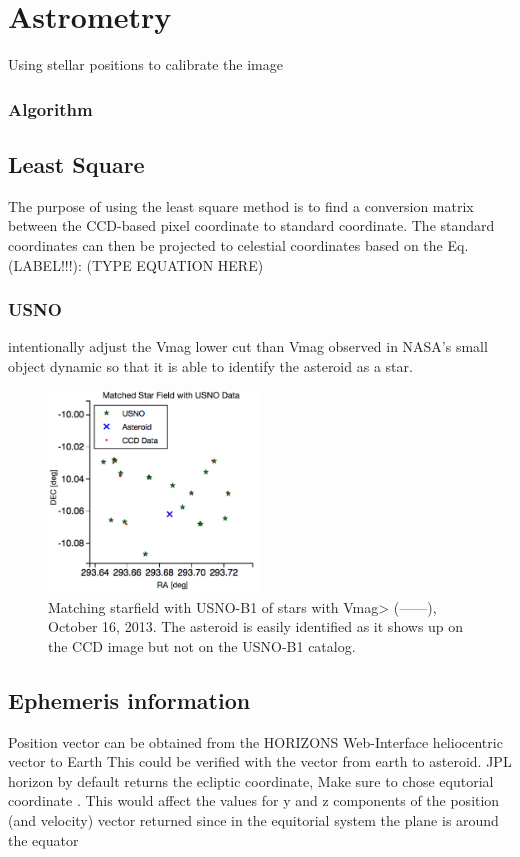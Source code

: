 \documentclass[authoryear, 12pt,5p, times]{elsarticle}
\begin{document}
\section{Astrometry}
Using stellar positions to calibrate the image
		\subsubsection{Algorithm}
	\subsection{Least Square}
	The purpose of using the least square method is to find a conversion matrix between the CCD-based pixel coordinate to standard coordinate.
	The standard coordinates can then be projected to celestial coordinates based on the Eq. (LABEL!!!):
	(TYPE EQUATION HERE)
	\subsubsection{USNO}
	intentionally adjust the Vmag lower cut than Vmag observed in NASA's small object dynamic so that it is able to identify the asteroid as a star.
	\begin{figure}[h!]
\includegraphics[width=0.5\textwidth]{figures/starfield_match}
\caption{ Matching starfield with USNO-B1 of stars with Vmag>  (------), October 16, 2013. The asteroid is easily identified as it shows up on the CCD image but not on the USNO-B1 catalog.}
\label{starfield_match}
\end{figure}
	\subsection{Ephemeris information}	
Position vector can be obtained from the HORIZONS Web-Interface 
heliocentric vector to Earth
This could be verified with the vector from earth to asteroid.
	JPL horizon by default returns the ecliptic coordinate, Make sure to chose equtorial coordinate . This would affect the values for y and z components of the position (and velocity) vector returned since in the equitorial system the plane is around the equator
	
\end{document}
